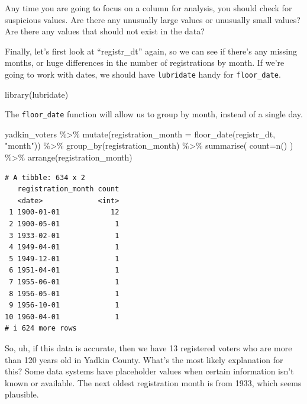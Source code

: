 \documentclass[
  letterpaper,
  DIV=11,
  numbers=noendperiod]{scrreprt}
\newenvironment{Shaded}{\begin{snugshade}}{\end{snugshade}}
\newcommand{\AttributeTok}[1]{\textcolor[rgb]{0.40,0.45,0.13}{#1}}
\newcommand{\FunctionTok}[1]{\textcolor[rgb]{0.28,0.35,0.67}{#1}}
\newcommand{\NormalTok}[1]{\textcolor[rgb]{0.00,0.23,0.31}{#1}}
\newcommand{\SpecialCharTok}[1]{\textcolor[rgb]{0.37,0.37,0.37}{#1}}
\newcommand{\StringTok}[1]{\textcolor[rgb]{0.13,0.47,0.30}{#1}}
\begin{document}
Any time you are going to focus on a column for analysis, you should
check for suspicious values. Are there any unusually large values or
unusually small values? Are there any values that should not exist in
the data?

Finally, let's first look at ``registr\_dt'' again, so we can see if
there's any missing months, or huge differences in the number of
registrations by month. If we're going to work with dates, we should
have \texttt{lubridate} handy for \texttt{floor\_date}.

\begin{Shaded}
\begin{Highlighting}[]
\FunctionTok{library}\NormalTok{(lubridate)}
\end{Highlighting}
\end{Shaded}

The \texttt{floor\_date} function will allow us to group by month,
instead of a single day.

\begin{Shaded}
\begin{Highlighting}[]
\NormalTok{yadkin\_voters }\SpecialCharTok{\%\textgreater{}\%}
  \FunctionTok{mutate}\NormalTok{(}\AttributeTok{registration\_month =} \FunctionTok{floor\_date}\NormalTok{(registr\_dt, }\StringTok{"month"}\NormalTok{)) }\SpecialCharTok{\%\textgreater{}\%}
  \FunctionTok{group\_by}\NormalTok{(registration\_month) }\SpecialCharTok{\%\textgreater{}\%}
   \FunctionTok{summarise}\NormalTok{(}
    \AttributeTok{count=}\FunctionTok{n}\NormalTok{()}
\NormalTok{  ) }\SpecialCharTok{\%\textgreater{}\%}
  \FunctionTok{arrange}\NormalTok{(registration\_month)}
\end{Highlighting}
\end{Shaded}

\begin{verbatim}
# A tibble: 634 x 2
   registration_month count
   <date>             <int>
 1 1900-01-01            12
 2 1900-05-01             1
 3 1933-02-01             1
 4 1949-04-01             1
 5 1949-12-01             1
 6 1951-04-01             1
 7 1955-06-01             1
 8 1956-05-01             1
 9 1956-10-01             1
10 1960-04-01             1
# i 624 more rows
\end{verbatim}

So, uh, if this data is accurate, then we have 13 registered voters who
are more than 120 years old in Yadkin County. What's the most likely
explanation for this? Some data systems have placeholder values when
certain information isn't known or available. The next oldest
registration month is from 1933, which seems plausible.
\end{document}
